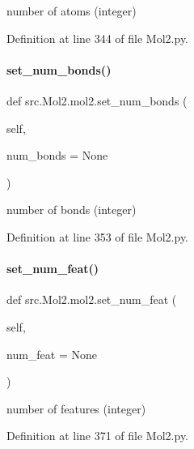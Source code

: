 number of atoms (integer) 



Definition at line 344 of file Mol2.\+py.

\mbox{\label{classsrc_1_1Mol2_1_1mol2_a2c8664f56c4b79f2810ef4b0a088d294}} 
\paragraph{\texorpdfstring{set\+\_\+num\+\_\+bonds()}{set\_num\_bonds()}}
{\footnotesize\ttfamily def src.\+Mol2.\+mol2.\+set\+\_\+num\+\_\+bonds (\begin{DoxyParamCaption}\item[{}]{self,  }\item[{}]{num\+\_\+bonds = {\ttfamily None} }\end{DoxyParamCaption})}



number of bonds (integer) 



Definition at line 353 of file Mol2.\+py.

\mbox{\label{classsrc_1_1Mol2_1_1mol2_a3303625224dc959c8b9e5857f42be74c}} 
\paragraph{\texorpdfstring{set\+\_\+num\+\_\+feat()}{set\_num\_feat()}}
{\footnotesize\ttfamily def src.\+Mol2.\+mol2.\+set\+\_\+num\+\_\+feat (\begin{DoxyParamCaption}\item[{}]{self,  }\item[{}]{num\+\_\+feat = {\ttfamily None} }\end{DoxyParamCaption})}



number of features (integer) 



Definition at line 371 of file Mol2.\+py.

